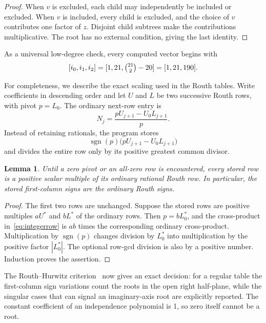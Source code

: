 \documentclass[11pt]{article}
\newtheorem{lemma}[theorem]{Lemma}
\begin{document}
\begin{proof}
When $v$ is excluded, each child may independently be included or excluded.
When $v$ is included, every child is excluded, and the choice of $v$
contributes one factor of $z$.  Disjoint child subtrees make the contributions
multiplicative.  The root has no external condition, giving the last identity.
\end{proof}

As a universal low-degree check, every computed vector begins with
\[
  [i_0,i_1,i_2]=[1,21,\tbinom{21}{2}-20]=[1,21,190].
\]

For completeness, we describe the exact scaling used in the Routh tables.
Write coefficients in descending order and let $U$ and $L$ be two successive
Routh rows, with pivot $p=L_0$.  The ordinary next-row entry is
\begin{equation}\label{eq:routh}
  N_j=\frac{pU_{j+1}-U_0L_{j+1}}{p}.
\end{equation}
Instead of retaining rationals, the program stores
\begin{equation}\label{eq:integerrow}
  \operatorname{sgn}(p)
  \bigl(pU_{j+1}-U_0L_{j+1}\bigr)
\end{equation}
and divides the entire row only by its positive greatest common divisor.

\begin{lemma}\label{lem:scaling}
Until a zero pivot or an all-zero row is encountered, every stored row is a
positive scalar multiple of its ordinary rational Routh row.  In particular,
the stored first-column signs are the ordinary Routh signs.
\end{lemma}

\begin{proof}
The first two rows are unchanged.  Suppose the stored rows are positive
multiples $aU^*$ and $bL^*$ of the ordinary rows.  Then $p=bL^*_0$, and the
cross-product in~\eqref{eq:integerrow} is $ab$ times the corresponding
ordinary cross-product.  Multiplication by $\operatorname{sgn}(p)$ changes
division by $L^*_0$ into multiplication by the positive factor $|L^*_0|$.
The optional row-gcd division is also by a positive number.  Induction proves
the assertion.
\end{proof}

The Routh--Hurwitz criterion~\cite{Routh1877,Hurwitz1895} now gives an exact decision:
for a regular table the first-column sign variations count the roots in the
open right half-plane, while the singular cases that can signal an
imaginary-axis root are explicitly reported.  The constant coefficient of an
independence polynomial is 1, so zero itself cannot be a root.
\end{document}

